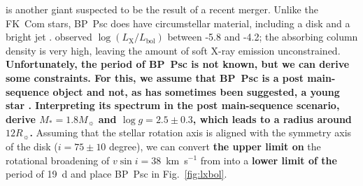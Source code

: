 \documentclass[linenumbers]{aastex631}
\begin{document}
 is another giant suspected to be the result of a recent merger. Unlike the FK~Com stars, BP~Psc does have circumstellar material, including a disk and a bright jet \citep{Zuckerman_2008}.
\citet{2010ApJ...719L..65K} observed $\log(L_\mathrm{X}/L_\mathrm{bol})$ between -5.8 and -4.2; the absorbing column density is very high, leaving the amount of soft X-ray emission unconstrained. \textbf{Unfortunately, the period of BP~Psc is not known, but we can derive some constraints. For this, we assume that BP~Psc is a post main-sequence object and not, as has sometimes been suggested, a young star \citep[see][for a discussion of the problems with young star scenarios]{Zuckerman_2008}. Interpreting its spectrum in the post main-sequence scenario, \citet{Zuckerman_2008} derive $M_*=1.8M_\sun$ and $\log g=2.5\pm0.3$, which leads to a radius around $12R_\sun$. }
Assuming that the stellar rotation axis is aligned with the symmetry axis of the disk ($i=75\pm10$ degree), we can convert \textbf{the upper limit on} the rotational broadening of $v \sin i=38$~km~s$^{-1}$ from \citet{Zuckerman_2008} into a \textbf{lower limit of the} period of 19~d and place BP~Psc in Fig.~\ref{fig:lxbol}.

\end{document}

